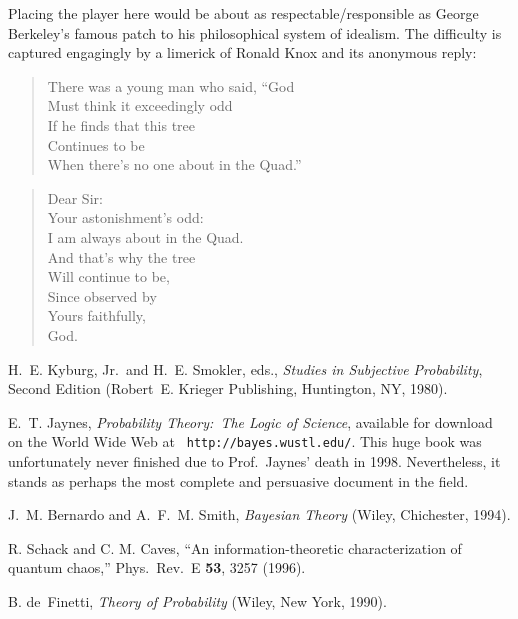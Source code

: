 \documentclass[12pt,aps,eqsecnum]{revtex4-1}
\begin{document}
\begin{thebibliography}{10}
Placing the player here would be about as respectable/responsible as
George Berkeley's famous patch to his philosophical system of
idealism.  The difficulty is captured engagingly by a limerick of
Ronald Knox and its anonymous reply:
\begin{quotation}
\footnotesize
\noindent There was a young man who said, ``God \\
Must think it exceedingly odd \\
If he finds that this tree \\
Continues to be \\
\smallskip When there's no one about in the Quad.''
\end{quotation}
\medskip{}
\begin{quotation}
\footnotesize
\noindent Dear Sir: \\
Your astonishment's odd: \\
I am always about in the Quad. \\
And that's why the tree \\
Will continue to be, \\
Since observed by \\
\indent \indent \indent Yours faithfully, \\
\indent \indent \indent God.
\end{quotation}

H.~E. Kyburg, Jr.\ and H.~E. Smokler, eds., {\sl Studies in
Subjective Probability}, Second Edition (Robert~E. Krieger
Publishing, Huntington, NY, 1980).

E.~T. Jaynes, {\sl Probability Theory:~The Logic of Science},
available for download on the World Wide Web at {\tt
http://bayes.wustl.edu/}.  This huge book was unfortunately never
finished due to Prof.~Jaynes' death in 1998. Nevertheless, it
stands as perhaps the most complete and persuasive document in
the field.

J.~M. Bernardo and A.~F.~M. Smith, {\sl Bayesian Theory} (Wiley,
Chichester, 1994).

R. Schack and C. M. Caves,
``An information-theoretic characterization of quantum chaos,''
Phys.\ Rev.\ E {\bf 53}, 3257 (1996).

B. de~Finetti, {\sl Theory of Probability\/} (Wiley, New York, 1990).


\end{thebibliography}
\end{document}
